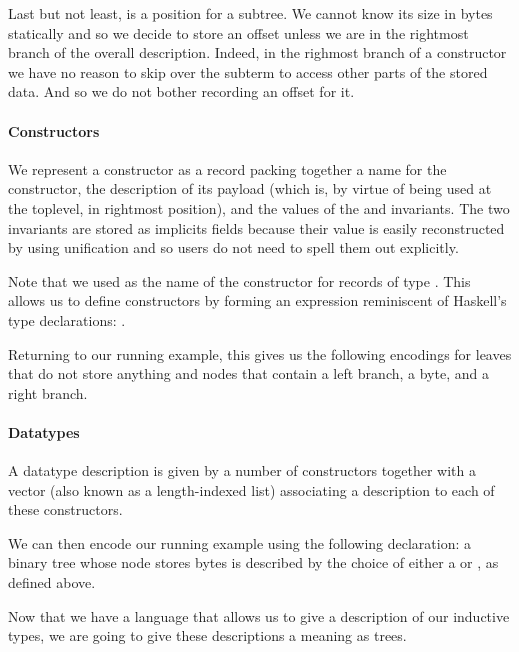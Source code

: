 Last but not least,  is a position for a subtree.
We cannot know its size in bytes statically and so we decide to store
an offset unless we are in the rightmost branch of the overall description.
%
Indeed, in the righmost branch of a constructor we have no reason to
skip over the subterm to access other parts of the stored data. And so we
do not bother recording an offset for it.


\paragraph{Constructors}
We represent a constructor as a record packing together
a name for the constructor,
the description of its payload (which is, by virtue of
being used at the toplevel, in rightmost position),
and the values of the  and
 invariants.
%
The two invariants are stored as implicits fields
because their value is easily reconstructed by \idris{}
using unification and so users do not need
to spell them out explicitly.


Note that we used \IdrisData{(::)} as the name of the
constructor for records of type .
This allows us to define constructors by forming an
expression reminiscent of Haskell's type declarations:
 \IdrisData{::} .

Returning to our running example, this gives us the following encodings for
leaves that do not store anything
and nodes that contain a left branch, a byte, and a right branch.



\paragraph{Datatypes}
A datatype description is given by a number of constructors together with
a vector (also known as a length-indexed list) associating a description
to each of these constructors.


We can then encode our running example using the following 
declaration: a binary tree whose node stores bytes is described by the choice
of either a  or , as defined above.


Now that we have a language that allows us to give a description of our
inductive types, we are going to give these descriptions a meaning as trees.
